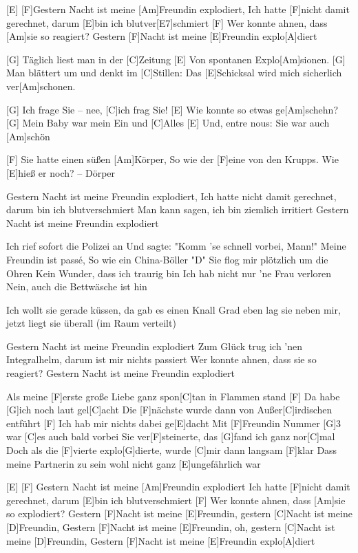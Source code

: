 

\begin{guitar}
	[E] [F]Gestern Nacht ist meine [Am]Freundin explodiert,
	Ich hatte [F]nicht damit gerechnet, darum [E]bin ich blutver[E7]schmiert
	[F] Wer konnte ahnen, dass [Am]sie so reagiert?
	Gestern [F]Nacht ist meine [E]Freundin explo[A]diert
	
	[G] Täglich liest man in der [C]Zeitung 
	[E] Von spontanen Explo[Am]sionen. 
	[G] Man blättert um und denkt im [C]Stillen: 
	Das [E]Schicksal wird mich sicherlich ver[Am]schonen.
	
	[G] Ich frage Sie – nee, [C]ich frag Sie!
	[E] Wie konnte so etwas ge[Am]schehn?
	[G] Mein Baby war mein Ein und [C]Alles 
	[E] Und, entre nous: Sie war auch [Am]schön
	
	[F] Sie hatte einen süßen [Am]Körper,
	So wie der [F]eine von den Krupps. Wie [E]hieß er noch? – Dörper
	
	Gestern Nacht ist meine Freundin explodiert,
	Ich hatte nicht damit gerechnet, darum bin ich blutverschmiert
	Man kann sagen, ich bin ziemlich irritiert
	Gestern Nacht ist meine Freundin explodiert
	
	Ich rief sofort die Polizei an
	Und sagte: "Komm ’se schnell vorbei, Mann!"
	Meine Freundin ist passé,
	So wie ein China-Böller "D"
	\pagebreak
	Sie flog mir plötzlich um die Ohren
	Kein Wunder, dass ich traurig bin
	Ich hab nicht nur ’ne Frau verloren
	Nein, auch die Bettwäsche ist hin
	
	Ich wollt sie gerade küssen, da gab es einen Knall
	Grad eben lag sie neben mir, jetzt liegt sie überall (im Raum verteilt)
	
	Gestern Nacht ist meine Freundin explodiert
	Zum Glück trug ich ’nen Integralhelm, darum ist mir nichts passiert
	Wer konnte ahnen, dass sie so reagiert?
	Gestern Nacht ist meine Freundin explodiert
	
	Als meine [F]erste große Liebe ganz spon[C]tan in Flammen stand
	[F] Da habe [G]ich noch laut gel[C]acht
	Die [F]nächste wurde dann von Außer[C]irdischen entführt
	[F] Ich hab mir nichts dabei ge[E]dacht
	Mit [F]Freundin Nummer [G]3 war [C]es auch bald vorbei
	Sie ver[F]steinerte, das [G]fand ich ganz nor[C]mal
	Doch als die [F]vierte explo[G]dierte, wurde [C]mir dann langsam [F]klar
	Dass meine Partnerin zu sein wohl nicht ganz [E]ungefährlich war
	
	[E] [F] Gestern Nacht ist meine [Am]Freundin explodiert
	Ich hatte [F]nicht damit gerechnet, darum [E]bin ich blutverschmiert
	[F] Wer konnte ahnen, dass [Am]sie so explodiert?
	Gestern [F]Nacht ist meine [E]Freundin, gestern [C]Nacht ist meine [D]Freundin, 
	Gestern [F]Nacht ist meine [E]Freundin, oh, gestern [C]Nacht ist meine [D]Freundin,
	Gestern [F]Nacht ist meine [E]Freundin explo[A]diert
\end{guitar}